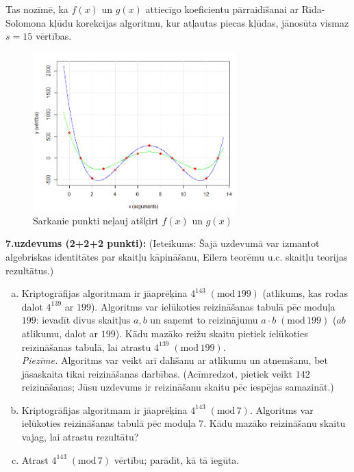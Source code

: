 \documentclass[11pt]{article}
\begin{document}
Tas nozīmē, ka $f(x)$ un $g(x)$ attiecīgo koeficientu pārraidīšanai ar Rīda-Solomona kļūdu korekcijas algoritmu, 
kur atļautas piecas kļūdas, jānosūta vismaz $s = 15$ vērtības. 

\begin{figure}[h!]
\begin{center}
\includegraphics[width=0.7\textwidth]{reed-solomon-plot.png}
\caption{Sarkanie punkti neļauj atšķirt $f(x)$ un $g(x)$\label{fig:reed-solomon-plot}}
\end{center}
\end{figure}


{\footnotesize
\vspace{6pt}
{\bf 7.uzdevums (2+2+2 punkti):}
(Ieteikums: Šajā uzdevumā var izmantot algebriskas identitātes par skaitļu kāpināšanu, Eilera teorēmu u.c. skaitļu teorijas rezultātus.)
\begin{enumerate}[(a)]
\item Kriptogrāfijas algoritmam ir jāaprēķina $4^{143}\;(\text{mod}\,199)$ (atlikums, kas rodas dalot $4^{139}$ ar $199$).
Algoritms var ielūkoties reizināšanas tabulā pēc moduļa $199$: ievadīt divus skaitļus $a,b$ un saņemt to reizinājumu
$a\cdot{}b\;(\text{mod}\,199)$ ($ab$ atlikumu, dalot ar $199$).
Kādu mazāko reižu skaitu pietiek ielūkoties reizināšanas tabulā, lai atrastu $4^{139}\;(\text{mod}\,199)$.\\
{\em Piezīme.} Algoritms var veikt arī dalīšanu ar atlikumu un atņemšanu, bet jāsaskaita tikai reizināšanas darbības.
(Acīmredzot, pietiek veikt $142$ reizināšanas; Jūsu uzdevums ir reizināšanu skaitu pēc iespējas samazināt.)
\item Kriptogrāfijas algoritmam ir jāaprēķina $4^{143}\;(\text{mod}\,7)$. Algoritms var ielūkoties reizināšanas tabulā
pēc moduļa $7$. Kādu mazāko reizināšanu skaitu vajag, lai atrastu rezultātu?
\item Atrast $4^{143}\;(\text{mod}\,7)$ vērtību; parādīt, kā tā iegūta.
\end{enumerate}
}
\end{document}
